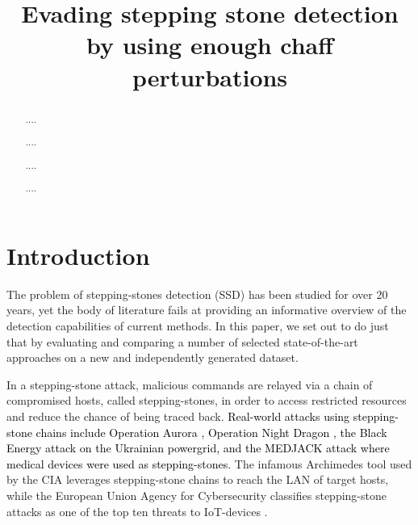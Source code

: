 \documentclass[runningheads,11pt]{llncs}\usepackage[]{graphicx}\usepackage[]{color}
\begin{document}
\title{Evading stepping stone detection by using enough chaff perturbations}



\maketitle     

\begin{abstract}

....

....

....

....
\end{abstract}



\section{Introduction}\label{Sec:Introduction}


The problem of stepping-stones detection (SSD) has been studied for over 20 years, yet the body of literature fails at providing an informative overview of the detection capabilities of current methods. In this paper, we set out to do just that by evaluating and comparing a number of selected state-of-the-art approaches on a new and independently generated dataset.


In a stepping-stone attack, malicious commands are relayed via a chain of compromised hosts, called stepping-stones, in order to access restricted resources and reduce the chance of being traced back. \textcolor{black}{Real-world attacks using stepping-stone chains include Operation Aurora \cite{tankard2011advanced}, Operation Night Dragon \cite{mcafee2015report}, the Black Energy \cite{eisac2017report} attack on the Ukrainian powergrid, and the MEDJACK \cite{ayala2016active} attack where medical devices were used as stepping-stones.} The infamous Archimedes tool \cite{archimedes2017} used by the CIA leverages stepping-stone chains to reach the LAN of target hosts, while the European Union Agency for Cybersecurity classifies stepping-stone attacks as one of the top ten threats to IoT-devices \cite{enisa2017baseline}.
\end{document}
